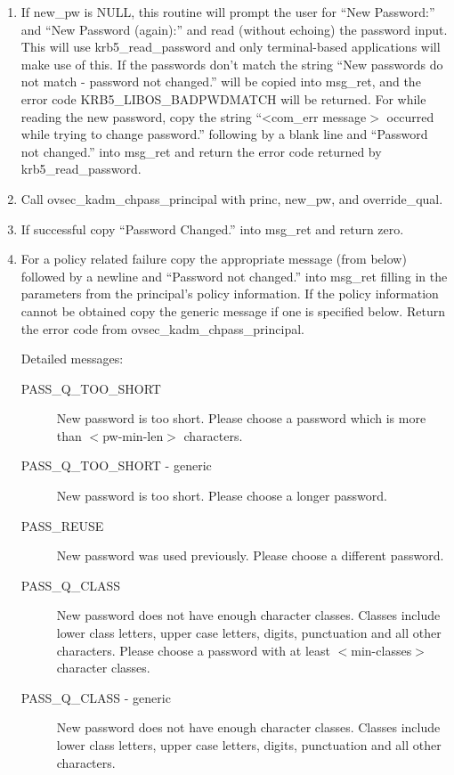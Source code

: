 \begin{enumerate}
\item If new_pw is NULL, this routine will prompt the user for
``New Password:'' and ``New Password (again):'' and read (without
echoing) the password input. This will use krb5_read_password and only
terminal-based applications will make use of this. If the passwords
don't match the string ``New passwords do not match - password not
changed.'' will be copied into msg_ret, and the error code
KRB5_LIBOS_BADPWDMATCH will be returned.  For while reading the new
password, copy the string ``<com_err message$>$ occurred while trying to
change password.''  following by a blank line and ``Password not
changed.'' into msg_ret and return the error code returned by
krb5_read_password.

\item Call ovsec_kadm_chpass_principal with princ, new_pw, and override_qual.

\item If successful copy ``Password Changed.'' into msg_ret and return zero.

\item For a policy related failure copy the appropriate message (from below) 
followed by a newline and ``Password not changed.'' into msg_ret
filling in the parameters from the principal's policy information. If
the policy information cannot be obtained copy the generic message if
one is specified below. Return the error code from
ovsec_kadm_chpass_principal.

Detailed messages:
\begin{description}

\item[PASS_Q_TOO_SHORT]
New password is too short. Please choose a
password which is more than $<$pw-min-len$>$ characters.

\item[PASS_Q_TOO_SHORT - generic]
New password is too short. Please choose a longer password.

\item[PASS_REUSE]
New password was used previously. Please choose a
different password.

\item[PASS_Q_CLASS]
New password does not have enough character classes. Classes include
lower class letters, upper case letters, digits, punctuation and all
other characters.  Please choose a password with at least
$<$min-classes$>$ character classes.

\item[PASS_Q_CLASS - generic]
New password does not have enough character classes. Classes include
lower class letters, upper case letters, digits, punctuation and all
other characters. 


\end{description}
\end{enumerate}
